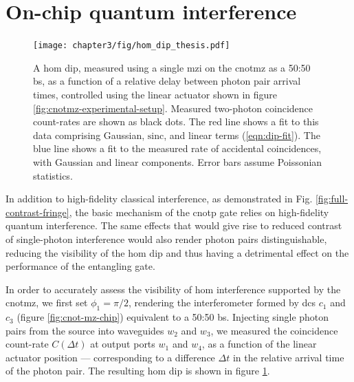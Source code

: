 \section{On-chip quantum interference}
\label{sec:cnot-mz-dip}
\begin{figure}[t]
\centering
\texttt{[image: chapter3/fig/hom\_dip\_thesis.pdf]}
\caption[\acrshort{hom} dip measured in the \acrshort{cnotmz}]{ A \gls{hom} dip, measured using a single \gls{mzi} on the \acrshort{cnotmz} as a 50:50 \gls{bs}, as a function of a relative delay between photon pair arrival times, controlled using the linear actuator shown in figure \ref{fig:cnotmz-experimental-setup}. Measured two-photon coincidence count-rates are shown as black dots. The red line shows a fit to this data comprising Gaussian, $\mathrm{sinc}$, and linear terms (\ref{eqn:dip-fit}). The blue line shows a fit to the measured rate of accidental coincidences, with Gaussian and linear components. Error bars assume Poissonian statistics.} \label{fig:cnot-mz-dip}
\end{figure}

In addition to high-fidelity classical interference, as demonstrated in Fig. \ref{fig:full-contrast-fringe}, the basic mechanism of the \acrshort{cnotp} gate relies on high-fidelity quantum interference. The same effects that would give rise to reduced contrast of single-photon interference would also render photon pairs distinguishable, reducing the visibility of the \gls{hom} dip and thus having a detrimental effect on the performance of the entangling gate.

In order to accurately assess the visibility of \gls{hom} interference supported by the \gls{cnotmz}, we first set $\phi_1=\pi/2$, rendering the interferometer formed by \glspl{dc} $c_1$ and $c_3$ (figure \ref{fig:cnot-mz-chip}) equivalent to a 50:50 \gls{bs}. Injecting single photon pairs from the source into waveguides $w_2$ and $w_3$, we measured the coincidence count-rate $C(\Delta t)$ at output ports $w_1$ and $w_4$, as a function of the linear actuator position --- corresponding to a difference $\Delta t$ in the relative arrival time of the photon pair. The resulting \gls{hom} dip is shown in figure \ref{fig:cnot-mz-dip}.

